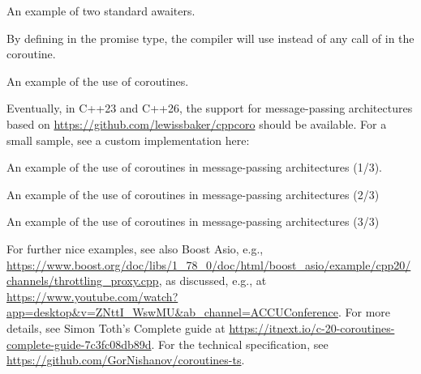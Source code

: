 \begin{itemize}
\begin{end}
\raggedbottom
\begin{codebox}[]{\href{https://godbolt.org/z/sK884T7hh}{\ExternalLink}}
\footnotesize An example of two standard awaiters.
\tcblower
{}
\end{codebox}

By defining  in the promise type, the compiler will use  instead of any call of  in the coroutine. 

\raggedbottom
\begin{codebox}[]{\href{https://godbolt.org/z/WKn5h181v}{\ExternalLink}}
\footnotesize An example of the use of coroutines.
\tcblower
{}
\end{codebox}

Eventually, in C++23 and C++26, the support for message-passing architectures based on \url{https://github.com/lewissbaker/cppcoro} should be available. For a small sample, see a custom implementation here:

\raggedbottom
\begin{codebox}[]{\href{https://godbolt.org/z/W8Khds7xh}{\ExternalLink}}
\footnotesize An example of the use of coroutines in message-passing architectures (1/3).
\tcblower
{}
\end{codebox}

\raggedbottom
\begin{codebox}[]{\href{https://godbolt.org/z/d3crro7hM}{\ExternalLink}}
\footnotesize An example of the use of coroutines in message-passing architectures (2/3)
\tcblower
{}
\end{codebox}

\raggedbottom
\begin{codebox}[]{\href{https://godbolt.org/z/n9Kc6TqMW}{\ExternalLink}}
\footnotesize An example of the use of coroutines in message-passing architectures (3/3)
\tcblower
{}
\end{codebox}

For further nice examples, see also Boost Asio, e.g.,
\url{https://www.boost.org/doc/libs/1_78_0/doc/html/boost_asio/example/cpp20/channels/throttling_proxy.cpp}, 
as discussed, e.g., at
\url{https://www.youtube.com/watch?app=desktop&v=ZNttI_WswMU&ab_channel=ACCUConference}.
For more details, see Simon Toth's Complete guide at \url{https://itnext.io/c-20-coroutines-complete-guide-7c3fc08db89d}.
For the technical specification, see \url{https://github.com/GorNishanov/coroutines-ts}.


\end{end}
\end{itemize}
